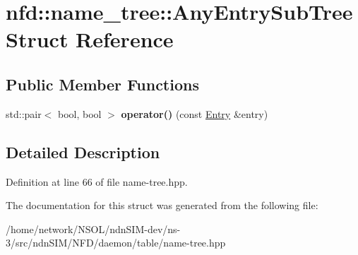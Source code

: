 \hypertarget{structnfd_1_1name__tree_1_1AnyEntrySubTree}{}\section{nfd\+:\+:name\+\_\+tree\+:\+:Any\+Entry\+Sub\+Tree Struct Reference}
\label{structnfd_1_1name__tree_1_1AnyEntrySubTree}
\subsection*{Public Member Functions}
\begin{DoxyCompactItemize}
\item 
std\+::pair$<$ bool, bool $>$ {\bfseries operator()} (const \hyperlink{classnfd_1_1name__tree_1_1Entry}{Entry} \&entry)\hypertarget{structnfd_1_1name__tree_1_1AnyEntrySubTree_a7ad2996820a4b43529393b39e334e9bb}{}\label{structnfd_1_1name__tree_1_1AnyEntrySubTree_a7ad2996820a4b43529393b39e334e9bb}

\end{DoxyCompactItemize}


\subsection{Detailed Description}


Definition at line 66 of file name-\/tree.\+hpp.



The documentation for this struct was generated from the following file\+:\begin{DoxyCompactItemize}
\item 
/home/network/\+N\+S\+O\+L/ndn\+S\+I\+M-\/dev/ns-\/3/src/ndn\+S\+I\+M/\+N\+F\+D/daemon/table/name-\/tree.\+hpp\end{DoxyCompactItemize}
